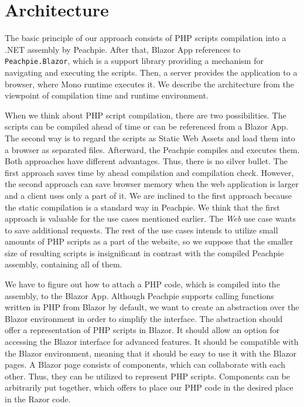 \section{Architecture}

The basic principle of our approach consists of PHP scripts compilation into a .NET assembly by Peachpie.
After that, Blazor App references to \texttt{Peachpie.Bla\-zor}, which is a support library providing a mechanism for navigating and executing the scripts.
Then, a server provides the application to a browser, where Mono runtime executes it.
We describe the architecture from the viewpoint of compilation time and runtime environment.
\par
When we think about PHP script compilation, there are two possibilities.
The scripts can be compiled ahead of time or can be referenced from a Blazor App. 
The second way is to regard the scripts as Static Web Assets and load them into a browser as separated files.
Afterward, the Peachpie compiles and executes them.
Both approaches have different advantages. 
Thus, there is no silver bullet.
The first approach saves time by ahead compilation and compilation check.
However, the second approach can save browser memory when the web application is larger and a client uses only a part of it.
We are inclined to the first approach because the static compilation is a standard way in Peachpie.
We think that the first approach is valuable for the use cases mentioned earlier.
The \textit{Web} use case wants to save additional requests. 
The rest of the use cases intends to utilize small amounts of PHP scripts as a part of the website, so we suppose that the smaller size of resulting scripts is insignificant in contrast with the compiled Peachpie assembly, containing all of them. 
\par
We have to figure out how to attach a PHP code, which is compiled into the assembly, to the Blazor App.
Although Peachpie supports calling functions written in PHP from Blazor by default, we want to create an abstraction over the Blazor environment in order to simplify the interface.
The abstraction should offer a representation of PHP scripts in Blazor.
It should allow an option for accessing the Blazor interface for advanced features.
It should be compatible with the Blazor environment, meaning that it should be easy to use it with the Blazor pages.
A Blazor page consists of components, which can collaborate with each other.
Thus, they can be utilized to represent PHP scripts.
Components can be arbitrarily put together, which offers to place our PHP code in the desired place in the Razor code.
